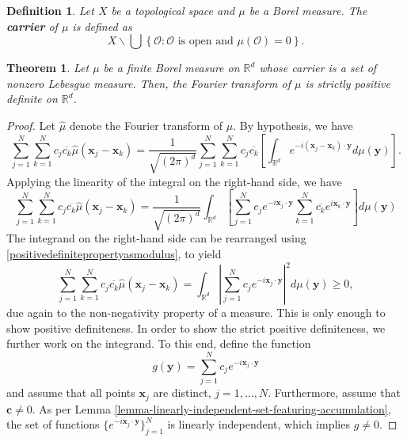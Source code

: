 \documentclass[12pt]{report} %
\newtheorem{definition}{Definition}
\newtheorem{theorem}{Theorem}
\newcommand{\tmmathbf}[1]{\ensuremath{\boldsymbol{#1}}}
\newcommand{\tmstrong}[1]{\textbf{#1}}
\begin{document}
\begin{definition}
  Let $X$ be a topological space and $\mu$ be a Borel measure.
  The {\tmstrong{carrier }}of $\mu$ is defined as
  \[ X\backslash \bigcup \left\{ \mathcal{O}: \mathcal{O} \text{ is open and }
    \mu (\mathcal{O}) = 0 \right\} . \]
\end{definition}

\begin{theorem}
  Let $\mu$ be a finite Borel measure on $\mathbb{R}^d$ whose
  carrier is a set of nonzero Lebesgue measure. Then, the Fourier transform of
  $\mu$ is strictly positive definite on $\mathbb{R}^d$.
\end{theorem}

\begin{proof}
  Let $\hat{\mu}$ denote the Fourier transform of $\mu$. By hypothesis,
  we have
  \[ \sum_{j = 1}^N \sum_{k = 1}^N c_j \overline{c_k} \hat{\mu}
    (\tmmathbf{x}_j -\tmmathbf{x}_k) = \frac{1}{\sqrt{(2 \pi)^d}} \sum_{j =
      1}^N \sum_{k = 1}^N c_j \overline{c_k}  \left[ \int_{\mathbb{R}^d} e^{- i
          (\tmmathbf{x}_j -\tmmathbf{x}_k) \cdot \tmmathbf{y}} d \mu (\tmmathbf{y})
      \right] . \]
  Applying the linearity of the integral on the right-hand side, we have
  \[ \sum_{j = 1}^N \sum_{k = 1}^N c_j \overline{c_k} \hat{\mu}
    (\tmmathbf{x}_j -\tmmathbf{x}_k) = \frac{1}{\sqrt{(2 \pi)^d}}
    \int_{\mathbb{R}^d} \left[ \sum_{j = 1}^N c_j e^{- i\tmmathbf{x}_j \cdot
          \tmmathbf{y}} \sum_{k = 1}^N \overline{c_k} e^{i\tmmathbf{x}_k \cdot
          \tmmathbf{y}} \right] d \mu (\tmmathbf{y}) \]
  The integrand on the right-hand side can be rearranged using
  \eqref{positivedefinitepropertyasmodulus}, to yield
  \begin{equation}
    \sum_{j = 1}^N \sum_{k = 1}^N c_j \overline{c_k} \hat{\mu} (\tmmathbf{x}_j
    -\tmmathbf{x}_k) = \int_{\mathbb{R}^d} \left| \sum_{j = 1}^N c_j e^{-
        i\tmmathbf{x}_j \cdot \tmmathbf{y}} \right|^2 d \mu (\tmmathbf{y}) \geq 0,
    \label{non-strict-inequality-measure-borel}
  \end{equation}
  due again to the non-negativity property of a measure. This is only enough to
  show positive definiteness. In order to show the strict positive
  definiteness, we further work on the integrand. To this end, define the
  function
  \[ g (\tmmathbf{y}) = \sum_{j = 1}^N c_j e^{- i\tmmathbf{x}_j \cdot
        \tmmathbf{y}} \]
  and assume that all points $\tmmathbf{x}_j$ are distinct, $j = 1, \ldots,
    N$. Furthermore, assume that $\tmmathbf{c} \neq 0$. As per Lemma
  \ref{lemma-linearly-independent-set-featuring-accumulation}, the set of
  functions $\{ e^{- i\tmmathbf{x}_j \cdot \tmmathbf{y}} \}_{j = 1}^N$ is
  linearly independent, which implies $g \neq 0$.


\end{proof}
\end{document}
